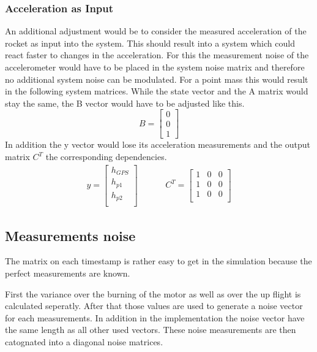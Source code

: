 \subsubsection{Acceleration as Input}
An additional adjustment would be to consider the measured acceleration of the rocket as input into the system.
This should result into a system which could react faster to changes in the acceleration.
For this the measurement noise of the accelerometer would have to be placed in the system noise matrix 
and therefore no additional system noise can be modulated.
For a point mass this would result in the following system matrices.
While the state vector and the A matrix would stay the same, the B vector would have to be adjusted like this.
$$ B = \begin{bmatrix}
        0 \\
        0 \\
        1
       \end{bmatrix}
$$
In addition the y vector would lose its acceleration measurements and the output matrix $C^T$ the corresponding dependencies.
\begin{align*}
 y = \begin{bmatrix}
      h_{GPS} \\
      h_{p1} \\
      h_{p2} \\
     \end{bmatrix}
      & \hspace{1cm}
 C^T = \begin{bmatrix}
        1 & 0 & 0 \\
        1 & 0 & 0 \\
        1 & 0 & 0 \\
       \end{bmatrix}
\end{align*}

\subsection{Measurements noise}
The matrix on each timestamp is rather easy to get in the simulation because the perfect measurements are known.

First the variance over the burning of the motor as well as over the up flight is calculated seperatly.
After that those values are used to generate a noise vector for each measurements.
In addition in the implementation the noise vector have the same length as all other used vectors.
These noise measurements are then catognated into a diagonal noise matrices.

